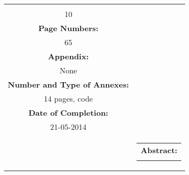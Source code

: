 \begin{titlepage}
\begin{nopagebreak}
{\begin{tabular}{cc}
{\begin{description}
						\item {\bf Copies:}\\ 10\\
						\item {\bf Page Numbers:}\\ 65\\
						\item {\bf Appendix:}\\ None\\
						\item {\bf Number and Type of Annexes:}\\ 14 pages, code\\
						\item {\bf Date of Completion:}\\ 21-05-2014\\
					\end{description}
					\vfill
				} &
				\parbox{7cm}{
					\vspace{.15cm}
					\hfill 
					\begin{tabular}{l}
						{\bf Abstract:}\bigskip \\
						\fbox{
							\parbox{6.5cm}{\smallskip
								{\vfill{\small 
								\smallskip}}
							}
						}
  					\end{tabular}
  				}
			\end{tabular}
		}\\
		\\
	\end{nopagebreak}
\end{titlepage}
